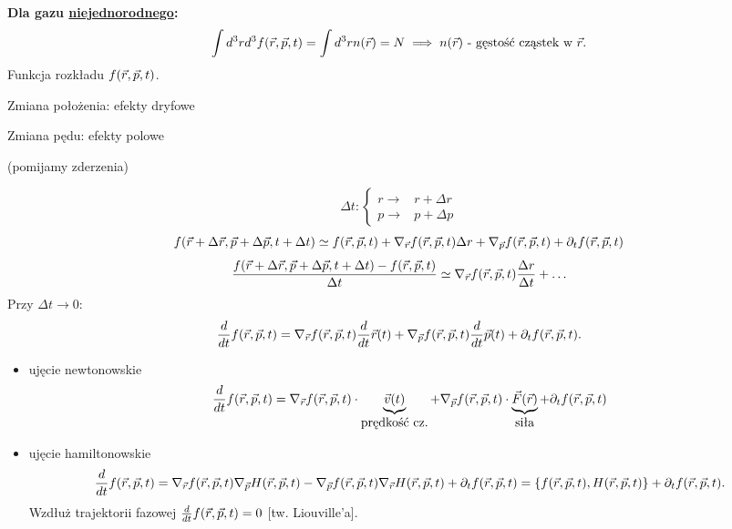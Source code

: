 \textbf{Dla gazu \underline{niejednorodnego}:}
\begin{equation}
\int d^3rd^3f(\vec{r},\vec{p},t) = \int d^3r n(\vec{r}) = N \implies n(\vec{r}) 
\mbox{ - gęstość cząstek w } \vec{r}.
\end{equation}
Funkcja rozkładu $f(\vec{r},\vec{p},t)$. 

Zmiana położenia: efekty dryfowe

Zmiana pędu: efekty polowe

(pomijamy zderzenia)

$$ \Delta t:
\begin{cases} r \to & r+\Delta r \\
				p \to & p+\Delta p\end{cases}$$
$$ f(\vec{r}+\Delta\vec{r},\vec{p}+\Delta\vec{p},t+\Delta t) \simeq 
f(\vec{r},\vec{p},t) +\nabla_{\vec{r}} f(\vec{r},\vec{p},t) \Delta r + \nabla_{\vec{p}} f(\vec{r},\vec{p},t) + \partial_t f(\vec{r},\vec{p},t) $$
$$\dfrac{f(\vec{r}+\Delta\vec{r},\vec{p}+\Delta\vec{p},t+\Delta t)-f(\vec{r},\vec{p},t)}{\Delta t}
\simeq \nabla_{\vec{r}} f(\vec{r},\vec{p},t) \frac{\Delta r}{\Delta t} + \ldots
$$
Przy $\Delta t \to 0$:
$$\dfrac{d}{dt} f(\vec{r},\vec{p},t) = \nabla_{\vec{r}} f(\vec{r},\vec{p},t) \dfrac{d}{dt} \vec{r}(t) + \nabla_{\vec{p}} f(\vec{r},\vec{p},t) 
\dfrac{d}{dt} \vec{p}(t) + \partial_t f(\vec{r},\vec{p},t).$$
\begin{itemize}
\item ujęcie newtonowskie
$$\dfrac{d}{dt} f (\vec{r},\vec{p},t) = \nabla_{\vec{r}}f(\vec{r},\vec{p},t)\cdot\underbrace{\vec{v}(t)}_{\mbox{prędkość
cz.}} +\nabla_{\vec{p}}f(\vec{r},\vec{p},t)\cdot\underbrace{\vec{F}(\vec{r})}_{\mbox{siła}}+\partial_t f(\vec{r},\vec{p},t)$$
\item ujęcie hamiltonowskie
$$\dfrac{d}{dt} f(\vec{r},\vec{p},t) = \nabla_{\vec{r}} f(\vec{r},\vec{p},t) \nabla_{\vec{p}} H(\vec{r},\vec{p},t) - \nabla_{\vec{p}}f(\vec{r},\vec{p},t) \nabla_{\vec{r}}H(\vec{r},\vec{p},t) +
\partial_t f(\vec{r},\vec{p},t) = \{ f(\vec{r},\vec{p},t),H(\vec{r},\vec{p},t) \} + \partial_t f(\vec{r},\vec{p},t).$$
Wzdłuż trajektorii fazowej $\frac{d}{dt}f(\vec{r},\vec{p},t) =0$ [tw. Liouville'a].
\end{itemize}
